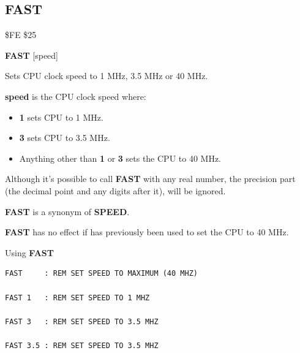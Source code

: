 \subsection{FAST}
\begin{description}[leftmargin=2cm,style=nextline]
\item [Token:]    \$FE \$25

\item [Format:]   {\bf FAST} [speed]

\item [Usage:]    Sets CPU clock speed to 1 MHz, 3.5 MHz or 40 MHz.

                  {\bf speed} is the CPU clock speed where:

                  \begin{itemize}
                     \item {\bf 1} sets CPU to 1 MHz.
                     \item {\bf 3} sets CPU to 3.5 MHz.
                     \item Anything other than {\bf 1} or {\bf 3} sets the CPU to 40 MHz.
                  \end{itemize}

\item [Remarks:]  Although it's possible to call {\bf FAST} with any real number, the precision part (the decimal point and any digits after it), will be ignored.

                  {\bf FAST} is a synonym of {\bf SPEED}.

                  {\bf FAST} has no effect if  has previously been used to set the CPU to 40 MHz.

\item [Examples:] Using {\bf FAST}

\begin{tcolorbox}[colback=black,coltext=white]
\verbatimfont{\codefont}
\begin{verbatim}
FAST     : REM SET SPEED TO MAXIMUM (40 MHZ)

FAST 1   : REM SET SPEED TO 1 MHZ

FAST 3   : REM SET SPEED TO 3.5 MHZ

FAST 3.5 : REM SET SPEED TO 3.5 MHZ
\end{verbatim}
\end{tcolorbox}
\end{description}


